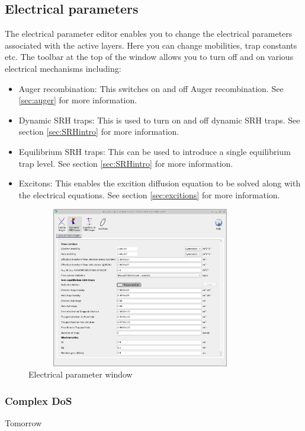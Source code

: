 \subsection{Electrical parameters}
The electrical parameter editor enables you to change the electrical parameters associated with the active layers. Here you can change mobilities, trap constants etc.  The toolbar at the top of the window allows you to turn off and on various electrical mechanisms including:

\begin{itemize}
  \item Auger recombination: This switches on and off Auger recombination. See \ref{sec:auger} for more information.
  \item Dynamic SRH traps: This is used to turn on and off dynamic SRH traps.  See section \ref{sec:SRHintro} for more information.
  \item Equilibrium SRH traps: This can be used to introduce a single equilibrium trap level.  See section \ref{sec:SRHintro} for more information.
  \item Excitons: This enables the excition diffusion equation to be solved along with the electrical equations. See section \ref{sec:excitions} for more information.
\end{itemize}

\begin{figure}[H]
\centering
\includegraphics[width=100mm,height=70mm]{./images/dos_editor.png}
\caption{Electrical parameter window}
\label{fig:jv_curve}
\end{figure}

\subsubsection{Complex DoS}
Tomorrow

